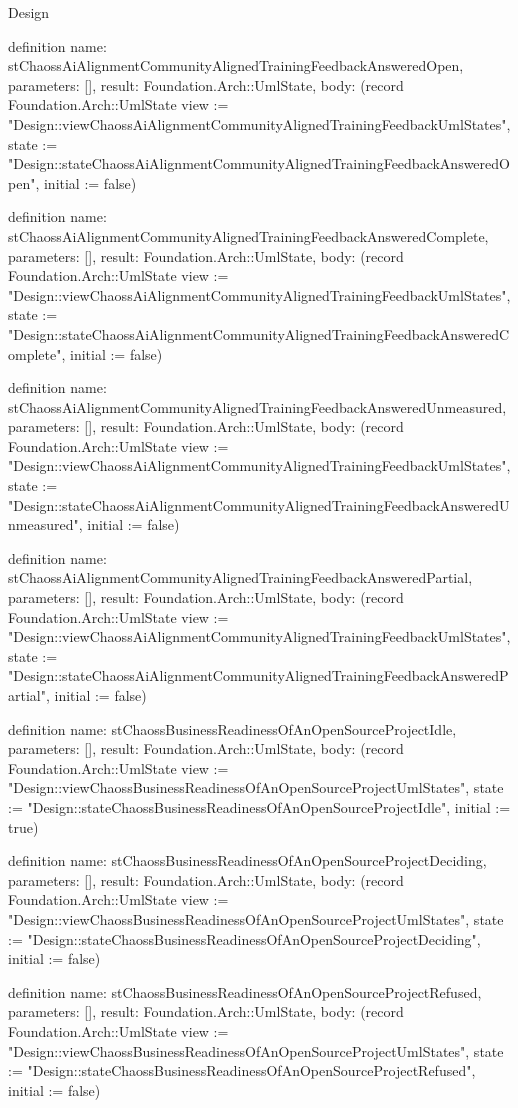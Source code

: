 \begin{lexlean}{Design}
\begin{semanticmodule}
definition{
  name: stChaossAiAlignmentCommunityAlignedTrainingFeedbackAnsweredOpen,
  parameters: [],
  result: Foundation.Arch::UmlState,
  body: (record Foundation.Arch::UmlState {view := "Design::viewChaossAiAlignmentCommunityAlignedTrainingFeedbackUmlStates", state := "Design::stateChaossAiAlignmentCommunityAlignedTrainingFeedbackAnsweredOpen", initial := false})
}

definition{
  name: stChaossAiAlignmentCommunityAlignedTrainingFeedbackAnsweredComplete,
  parameters: [],
  result: Foundation.Arch::UmlState,
  body: (record Foundation.Arch::UmlState {view := "Design::viewChaossAiAlignmentCommunityAlignedTrainingFeedbackUmlStates", state := "Design::stateChaossAiAlignmentCommunityAlignedTrainingFeedbackAnsweredComplete", initial := false})
}

definition{
  name: stChaossAiAlignmentCommunityAlignedTrainingFeedbackAnsweredUnmeasured,
  parameters: [],
  result: Foundation.Arch::UmlState,
  body: (record Foundation.Arch::UmlState {view := "Design::viewChaossAiAlignmentCommunityAlignedTrainingFeedbackUmlStates", state := "Design::stateChaossAiAlignmentCommunityAlignedTrainingFeedbackAnsweredUnmeasured", initial := false})
}

definition{
  name: stChaossAiAlignmentCommunityAlignedTrainingFeedbackAnsweredPartial,
  parameters: [],
  result: Foundation.Arch::UmlState,
  body: (record Foundation.Arch::UmlState {view := "Design::viewChaossAiAlignmentCommunityAlignedTrainingFeedbackUmlStates", state := "Design::stateChaossAiAlignmentCommunityAlignedTrainingFeedbackAnsweredPartial", initial := false})
}

definition{
  name: stChaossBusinessReadinessOfAnOpenSourceProjectIdle,
  parameters: [],
  result: Foundation.Arch::UmlState,
  body: (record Foundation.Arch::UmlState {view := "Design::viewChaossBusinessReadinessOfAnOpenSourceProjectUmlStates", state := "Design::stateChaossBusinessReadinessOfAnOpenSourceProjectIdle", initial := true})
}

definition{
  name: stChaossBusinessReadinessOfAnOpenSourceProjectDeciding,
  parameters: [],
  result: Foundation.Arch::UmlState,
  body: (record Foundation.Arch::UmlState {view := "Design::viewChaossBusinessReadinessOfAnOpenSourceProjectUmlStates", state := "Design::stateChaossBusinessReadinessOfAnOpenSourceProjectDeciding", initial := false})
}

definition{
  name: stChaossBusinessReadinessOfAnOpenSourceProjectRefused,
  parameters: [],
  result: Foundation.Arch::UmlState,
  body: (record Foundation.Arch::UmlState {view := "Design::viewChaossBusinessReadinessOfAnOpenSourceProjectUmlStates", state := "Design::stateChaossBusinessReadinessOfAnOpenSourceProjectRefused", initial := false})
}


\end{semanticmodule}
\end{lexlean}

